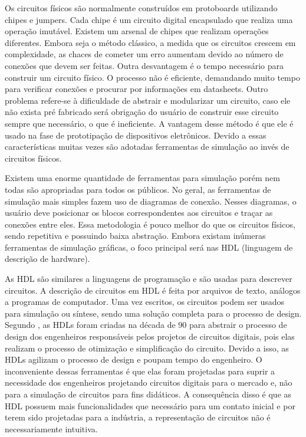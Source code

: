 Os circuitos físicos são normalmente construídos em protoboards utilizando chipes e jumpers.
Cada chipe é um circuito digital encapsulado que realiza uma operação imutável.
Existem um arsenal de chipes que realizam operações diferentes.
Embora seja o método clássico, a medida que os circuitos crescem em complexidade, as chaces de cometer um erro aumentam devido ao número de conexões que devem ser feitas.
Outra desvantagem é o tempo necessário para construir um circuito físico.
O processo não é eficiente, demandando muito tempo para verificar conexões e procurar por informações em datasheets.
Outro problema refere-se à dificuldade de abstrair e modularizar um circuito, caso ele não exista pré fabricado será obrigação do usuário de construir esse circuito sempre que necessário, o que é ineficiente.
A vantagem desse método é que ele é usado na fase de prototipação de dispositivos eletrônicos.
Devido a essas características muitas vezes são adotadas ferramentas de simulação ao invés de circuitos físicos.

Existem uma enorme quantidade de ferramentas para simulação porém nem todas são apropriadas para todos os públicos.
No geral, as ferramentas de simulação mais simples fazem uso de diagramas de conexão.
Nesses diagramas, o usuário deve posicionar os blocos correspondentes aos circuitos e traçar as conexões entre eles.
Essa metodologia é pouco melhor do que os circuitos físicos, sendo repetitiva e possuindo baixa abstração.
Embora existam inúmeras ferramentas de simulação gráficas, o foco principal será nas HDL (linguagem de descrição de hardware).

As HDL são similares a linguagens de programação e são usadas para descrever circuitos.
A descrição de circuitos em HDL é feita por arquivos de texto, análogos a programas de computador.
Uma vez escritos, os circuitos podem ser usados para simulação ou síntese, sendo uma solução completa para o processo de design.
Segundo \textcite{harris}, as HDLs foram criadas na década de 90 para abstrair o processo de design dos engenheiros responsáveis pelos projetos de circuitos digitais, pois elas realizam o processo de otimização e simplificação do circuito.
Devido a isso, as HDLs agilizam o processo de design e poupam tempo do engenheiro.
O inconveniente dessas ferramentas é que elas foram projetadas para suprir a necessidade dos engenheiros projetando circuitos digitais para o mercado e, não para a simulação de circuitos para fins didáticos.
A consequência disso é que as HDL possuem mais funcionalidades que necessário para um contato inicial e por terem sido projetadas para a indústria, a representação de circuitos não é necessariamente intuitiva.

